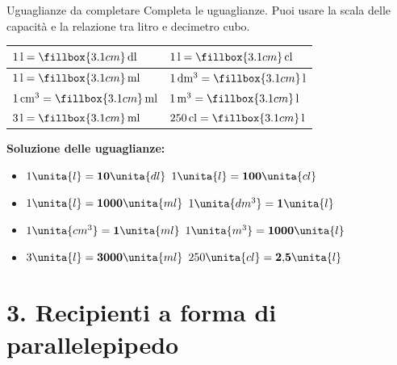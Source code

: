 \begin{esercizio}{Uguaglianze da completare}
Completa le uguaglianze. Puoi usare la scala delle capacità e la relazione tra litro e decimetro cubo.

\vspace{0.2cm}
\renewcommand{\arraystretch}{2.25}
\begin{tabularx}{\linewidth}{|X|X|}
\hline
$1\,\mathrm{l}=\fillbox{3.1cm}\,\mathrm{dl}$ & $1\,\mathrm{l}=\fillbox{3.1cm}\,\mathrm{cl}$ \\
\hline
$1\,\mathrm{l}=\fillbox{3.1cm}\,\mathrm{ml}$ & $1\,\mathrm{dm^3}=\fillbox{3.1cm}\,\mathrm{l}$ \\
\hline
$1\,\mathrm{cm^3}=\fillbox{3.1cm}\,\mathrm{ml}$ & $1\,\mathrm{m^3}=\fillbox{3.1cm}\,\mathrm{l}$ \\
\hline
$3\,\mathrm{l}=\fillbox{3.1cm}\,\mathrm{ml}$ & $250\,\mathrm{cl}=\fillbox{3.1cm}\,\mathrm{l}$ \\
\hline
\end{tabularx}

\begin{soluzione}
  \textbf{Soluzione delle uguaglianze:}
  \begin{itemize}
    \item $1\unita{l} = \mathbf{10}\unita{dl}$ \hfill $1\unita{l} = \mathbf{100}\unita{cl}$
    \item $1\unita{l} = \mathbf{1000}\unita{ml}$ \hfill $1\unita{dm^3} = \mathbf{1}\unita{l}$
    \item $1\unita{cm^3} = \mathbf{1}\unita{ml}$ \hfill $1\unita{m^3} = \mathbf{1000}\unita{l}$
    \item $3\unita{l} = \mathbf{3000}\unita{ml}$ \hfill $250\unita{cl} = \mathbf{2{,}5}\unita{l}$
  \end{itemize}
\end{soluzione}
\end{esercizio}

\condnewpage

\section*{3. Recipienti a forma di parallelepipedo}

